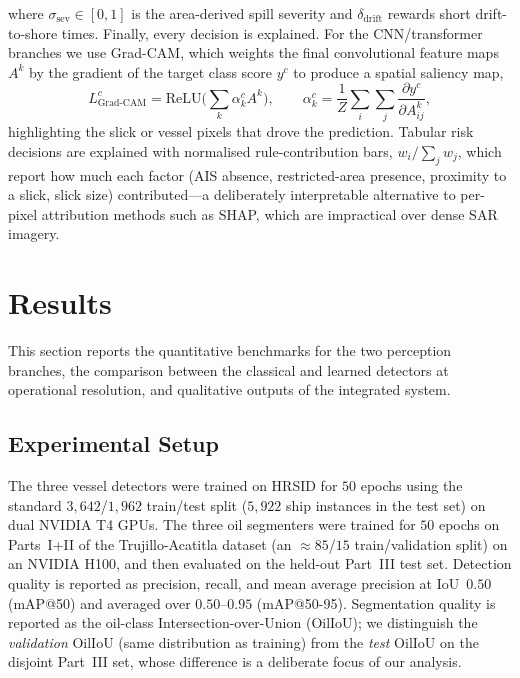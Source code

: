 \documentclass[a4paper,11pt]{article}
\begin{document}
where $\sigma_{\text{sev}}\in[0,1]$ is the area-derived spill severity and
$\delta_{\text{drift}}$ rewards short drift-to-shore times. Finally, every decision is
explained. For the CNN/transformer branches we use Grad-CAM, which weights the final
convolutional feature maps $A^k$ by the gradient of the target class score $y^c$ to
produce a spatial saliency map,
\begin{equation}
L^{c}_{\text{Grad-CAM}} = \mathrm{ReLU}\!\Big(\sum_k \alpha^{c}_k A^{k}\Big),
\qquad
\alpha^{c}_k = \frac{1}{Z}\sum_i \sum_j \frac{\partial y^{c}}{\partial A^{k}_{ij}},
\end{equation}
highlighting the slick or vessel pixels that drove the prediction. Tabular risk
decisions are explained with normalised rule-contribution bars, $w_i / \sum_j w_j$,
which report how much each factor (AIS absence, restricted-area presence, proximity to a
slick, slick size) contributed---a deliberately interpretable alternative to per-pixel
attribution methods such as SHAP, which are impractical over dense SAR imagery.

\section{Results}

This section reports the quantitative benchmarks for the two perception branches, the
comparison between the classical and learned detectors at operational resolution, and
qualitative outputs of the integrated system.

\subsection{Experimental Setup}

The three vessel detectors were trained on HRSID for $50$ epochs using the standard
$3{,}642$/$1{,}962$ train/test split ($5{,}922$ ship instances in the test set) on dual
NVIDIA T4 GPUs. The three oil segmenters were trained for $50$ epochs on Parts~I+II of
the Trujillo-Acatitla dataset (an $\approx85$/$15$ train/validation split) on an NVIDIA
H100, and then evaluated on the held-out Part~III test set. Detection quality is
reported as precision, recall, and mean average precision at IoU~$0.50$ (mAP@50) and
averaged over $0.50$--$0.95$ (mAP@50-95). Segmentation quality is reported as the
oil-class Intersection-over-Union (OilIoU); we distinguish the \emph{validation} OilIoU
(same distribution as training) from the \emph{test} OilIoU on the disjoint Part~III
set, whose difference is a deliberate focus of our analysis.
\end{document}
